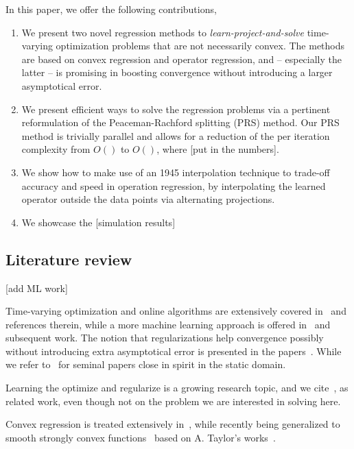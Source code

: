 \documentclass{article}
\newcommand{\andrea}[1]{{\color{red}[#1]}}
\begin{document}
In this paper, we offer the following contributions,
\begin{enumerate}
\item We present two novel regression methods to \emph{learn-project-and-solve} time-varying optimization problems that are not necessarily convex. The methods are based on convex regression and operator regression, and -- especially the latter -- is promising in boosting convergence without introducing a larger asymptotical error. 
\item We present efficient ways to solve the regression problems via a pertinent reformulation of the Peaceman-Rachford splitting (PRS) method. Our PRS method is trivially parallel and allows for a reduction of the per iteration complexity from $O()$ to $O()$, where \andrea{put in the numbers}.  
\item We show how to make use of an 1945 interpolation technique to trade-off accuracy and speed in operation regression, by interpolating the learned operator outside the data points via alternating projections. 
\item We showcase the \andrea{simulation results}
\end{enumerate}

\subsection{Literature review}

\andrea{add ML work}

Time-varying optimization and online algorithms are extensively covered in~\cite{SPM, simonetto_time-varying_2020} and references therein, while a more machine learning approach is offered in~\cite{Jadbabaie2015} and subsequent work. The notion that regularizations help convergence possibly without introducing extra asymptotical error is presented in the papers~\cite{Simonetto2014d, Bastianello2020asi}. While we refer to~\cite{Devolder2011,Nedic2011} for seminal papers close in spirit in the static domain. 

Learning the optimize and regularize is a growing research topic, and we cite~\cite{Nghiem2018,Ongie2020}, as related work, even though not on the problem we are interested in solving here. 

Convex regression is treated extensively in~\cite{Seijo2011,Lim2012,Mazumder2019,Blanchet2019}, while recently being generalized to smooth strongly convex functions~\cite{simonetto_smooth_2021} based on A. Taylor's works~\cite{Taylor2016, Taylor2017}.
\end{document}

